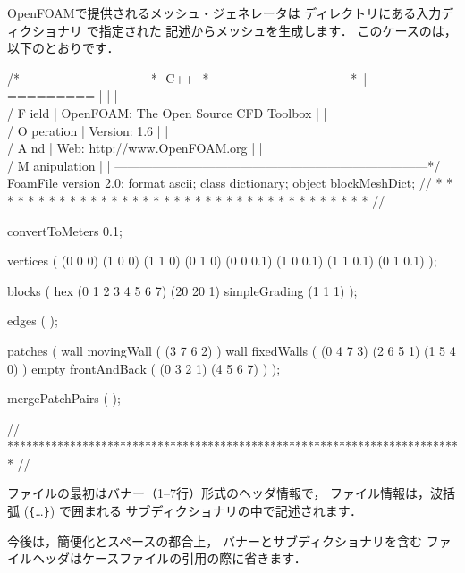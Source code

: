 OpenFOAMで提供されるメッシュ・ジェネレータは
ディレクトリにある入力ディクショナリ
%
%
で指定された
記述からメッシュを生成します．
このケースのは，以下のとおりです．
\begin{OFverbatim}
/*--------------------------------*- C++ -*----------------------------------*\
| =========                 |                                                 |
| \\      /  F ield         | OpenFOAM: The Open Source CFD Toolbox           |
|  \\    /   O peration     | Version:  1.6                                   |
|   \\  /    A nd           | Web:      http://www.OpenFOAM.org               |
|    \\/     M anipulation  |                                                 |
\*---------------------------------------------------------------------------*/
FoamFile
{
    version     2.0;
    format      ascii;
    class       dictionary;
    object      blockMeshDict;
}
// * * * * * * * * * * * * * * * * * * * * * * * * * * * * * * * * * * * * * //

convertToMeters 0.1;

vertices
(
    (0 0 0)
    (1 0 0)
    (1 1 0)
    (0 1 0)
    (0 0 0.1)
    (1 0 0.1)
    (1 1 0.1)
    (0 1 0.1)
);

blocks
(
    hex (0 1 2 3 4 5 6 7) (20 20 1) simpleGrading (1 1 1)
);

edges
(
);

patches
(
    wall movingWall
    (
        (3 7 6 2)
    )
    wall fixedWalls
    (
        (0 4 7 3)
        (2 6 5 1)
        (1 5 4 0)
    )
    empty frontAndBack
    (
        (0 3 2 1)
        (4 5 6 7)
    )
);

mergePatchPairs
(
);

// ************************************************************************* //
\end{OFverbatim}
ファイルの最初はバナー（1--7行）形式のヘッダ情報で，
ファイル情報は，波括弧 (\verb|{|\ldots\verb|}|) で囲まれる
サブディクショナリの中で記述されます．

今後は，簡便化とスペースの都合上，
バナーとサブディクショナリを含む
ファイルヘッダはケースファイルの引用の際に省きます．

